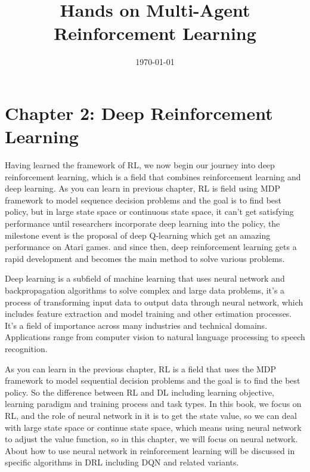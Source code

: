 \documentclass{article}
\begin{document}
	
	\title{Hands on Multi-Agent Reinforcement Learning}
	
	\date{\today}
	
	\maketitle
	
	\tableofcontents  %
	\clearpage  %

	\newpage
	\section{Chapter 2: Deep Reinforcement Learning }
    \setcounter{section}{2}


Having learned the framework of RL, we now begin our journey into deep reinforcement learning, which is a field that combines reinforcement learning and deep learning. As you can learn in previous chapter, RL is field using MDP framework to model sequence decision problems and the goal is to find best policy, but in large state space or continuous state space, it can't get satisfying performance until researchers incorporate deep learning into the policy, the milestone event is the proposal of deep Q-learning which get an amazing performance on Atari games. and since then, deep reinforcement learning gets a rapid development and becomes the main method to solve various problems.

Deep learning is a subfield of machine learning that uses neural network and backpropagation algorithms to solve complex and large data problems, it's a process of transforming input data to output data through neural network, which includes feature extraction and model training and other estimation processes. It's a field of importance across many industries and technical domains. Applications range from computer vision to natural language processing to speech recognition.

As you can learn in the previous chapter, RL is a field that uses the MDP framework to model sequential decision problems and the goal is to find the best policy. So the difference between RL and DL including learning objective, learning paradigm and training process and task types. In this book, we focus on RL, and the role of neural network in it is to get the state value, so we can deal with large state space or continue state space, which means using neural network to adjust the value function, so in this chapter, we will focus on neural network. About how to use neural network in reinforcement learning will be discussed in specific algorithms in DRL including DQN and related variants.
\end{document}
